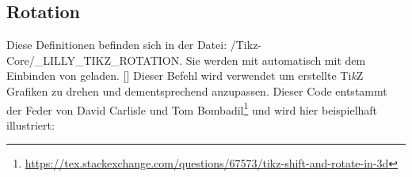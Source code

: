 \subsection{Rotation}
Diese Definitionen befinden sich in der Datei: {\ltt\LILLYxPATHxGRAPHICS/Tikz-Core/\_LILLY\_TIKZ\_ROTATION}. Sie werden mit  automatisch mit dem Einbinden von\newline {} geladen.\medskip\newline
%
%
%
[]
Dieser Befehl wird verwendet um erstellte Ti\textit{k}Z Grafiken zu drehen und dementsprechend anzupassen. Dieser Code entstammt der Feder von David Carlisle und Tom Bombadil\footnote{\url{https://tex.stackexchange.com/questions/67573/tikz-shift-and-rotate-in-3d}} und wird hier beispielhaft illustriert:
\newcommand{\examplecube}%
{   \coordinate (a) at (-2,-2,-2);
    \coordinate (b) at (-2,-2,2);
    \coordinate (c) at (-2,2,-2);
    \coordinate (d) at (-2,2,2);
    \coordinate (e) at (2,-2,-2);
    \coordinate (f) at (2,-2,2);
    \coordinate (g) at (2,2,-2);
    \coordinate (h) at (2,2,2);
    \draw (a)--(b) (a)--(c) (a)--(e) (b)--(d) (b)--(f) (c)--(d) (c)--(g) (d)--(h) (e)--(f) (e)--(g) (f)--(h) (g)--(h);
    \fill[Ao] (a) circle (0.1cm);
    \fill[tealblue] (d) ++(0.1cm,0.1cm) rectangle ++(-0.2cm,-0.2cm);
}
